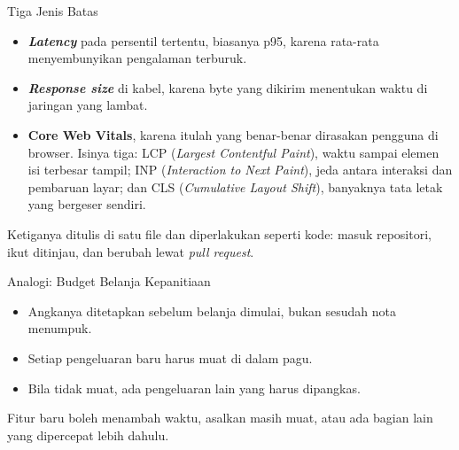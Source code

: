 \documentclass[aspectratio=169, table, 12pt]{beamer}
\begin{document}
\begin{frame}{{\Large Tiga Jenis Batas}}
  \vspace{10pt}
  \begin{itemize}
    \item \textbf{\textit{Latency}} pada persentil tertentu, biasanya p95, karena
          rata-rata menyembunyikan pengalaman terburuk.
    \item \textbf{\textit{Response size}} di kabel, karena byte yang dikirim
          menentukan waktu di jaringan yang lambat.
    \item \textbf{Core Web Vitals}, karena itulah yang benar-benar dirasakan
          pengguna di browser. Isinya tiga: LCP (\textit{Largest Contentful
          Paint}), waktu sampai elemen isi terbesar tampil; INP
          (\textit{Interaction to Next Paint}), jeda antara interaksi dan
          pembaruan layar; dan CLS (\textit{Cumulative Layout Shift}),
          banyaknya tata letak yang bergeser sendiri.
  \end{itemize}
  \vspace{6pt}
  {\footnotesize Ketiganya ditulis di satu file dan diperlakukan seperti
  kode: masuk repositori, ikut ditinjau, dan berubah lewat \textit{pull
  request}.}
\end{frame}

\begin{frame}{{\Large Analogi: Budget Belanja Kepanitiaan}}
  \vspace{14pt}
  \begin{itemize}
    \item Angkanya ditetapkan sebelum belanja dimulai, bukan sesudah nota
          menumpuk.
    \item Setiap pengeluaran baru harus muat di dalam pagu.
    \item Bila tidak muat, ada pengeluaran lain yang harus dipangkas.
  \end{itemize}
  \vspace{10pt}
  {\footnotesize Fitur baru boleh menambah waktu, asalkan masih muat, atau
  ada bagian lain yang dipercepat lebih dahulu.}
\end{frame}
\end{document}
